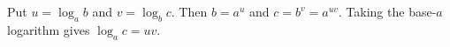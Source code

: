 Put $u=\log_ab$ and $v=\log_bc$. Then $b=a^u$ and $c=b^v=a^{uv}$. Taking the base-$a$ logarithm gives $\log_ac=uv$.
